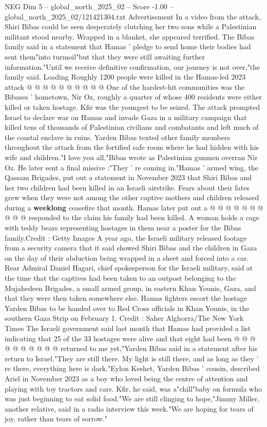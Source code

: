 \begin{textsample}{NEG Dim 5 – global\_north\_2025\_02 – Score -1.00 – global\_north\_2025\_02/121421304.txt}
Advertisement In a video from the attack, Shiri Bibas could be seen desperately clutching her two sons while a Palestinian militant stood nearby.
Wrapped in a blanket, she appeared terrified.
The Bibas family said in a statement that Hamas ' pledge to send home their bodies had sent them"into turmoil"but that they were still awaiting further information."Until we receive definitive confirmation, our journey is not over,"the family said.
Loading Roughly 1200 people were killed in the Hamas-led 2023 attack @ @ @ @ @ @ @ @ @ @ One of the hardest-hit communities was the Bibases ' hometown, Nir Oz, roughly a quarter of whose 400 residents were either killed or taken hostage.
Kfir was the youngest to be seized.
The attack prompted Israel to declare war on Hamas and invade Gaza in a military campaign that killed tens of thousands of Palestinian civilians and combatants and left much of the coastal enclave in ruins.
Yarden Bibas texted other family members throughout the attack from the fortified safe room where he had hidden with his wife and children."I love you all,"Bibas wrote as Palestinian gunmen overran Nir Oz.
He later sent a final missive :"They ' re coming in."Hamas ' armed wing, the Qassam Brigades, put out a statement in November 2023 that Shiri Bibas and her two children had been killed in an Israeli airstrike.
Fears about their fates grew when they were not among the other captive mothers and children released during a \textbf{weeklong} ceasefire that month.
Hamas later put out a @ @ @ @ @ @ @ @ @ @ responded to the claim his family had been killed.
A woman holds a cage with teddy bears representing hostages in them near a poster for the Bibas family.Credit : Getty Images A year ago, the Israeli military released footage from a security camera that it said showed Shiri Bibas and the children in Gaza on the day of their abduction being wrapped in a sheet and forced into a car.
Rear Admiral Daniel Hagari, chief spokesperson for the Israeli military, said at the time that the captives had been taken to an outpost belonging to the Mujahedeen Brigades, a small armed group, in eastern Khan Younis, Gaza, and that they were then taken somewhere else.
Hamas fighters escort the hostage Yarden Bibas to be handed over to Red Cross officials in Khan Younis, in the southern Gaza Strip on February 1.
Credit : Saher Alghorra/The New York Times The Israeli government said last month that Hamas had provided a list indicating that 25 of the 33 hostages were alive and that eight had been @ @ @ @ @ @ @ @ @ @ returned to me yet,"Yarden Bibas said in a statement after his return to Israel."They are still there.
My light is still there, and as long as they ' re there, everything here is dark."Eylon Keshet, Yarden Bibas ' cousin, described Ariel in November 2023 as a boy who loved being the centre of attention and playing with toy tractors and cars.
Kfir, he said, was a"chill"baby on formula who was just beginning to eat solid food."We are still clinging to hope,"Jimmy Miller, another relative, said in a radio interview this week."We are hoping for tears of joy, rather than tears of sorrow."

\end{textsample}
